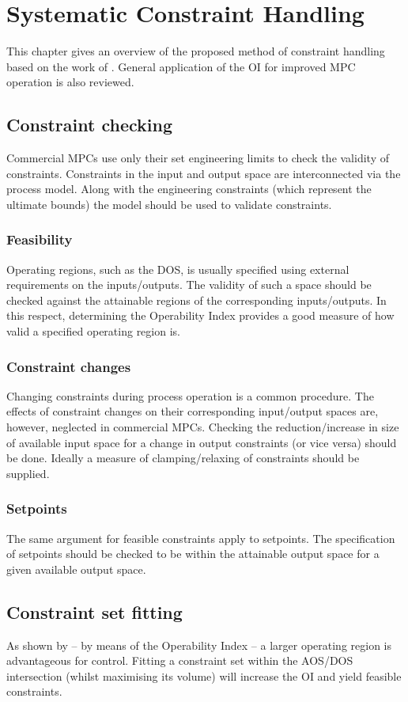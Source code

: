 \chapter{Systematic Constraint Handling}\label{chap:conhand}
\begin{overview}
  This chapter gives an overview of the proposed method of constraint handling based on the work of \citet{vinsonphd}.
  General application of the OI for improved MPC operation is also reviewed.
\end{overview}

\section{Constraint checking}
Commercial MPCs use only their set engineering limits to check the validity of constraints.
Constraints in the input and output space are interconnected via the process model.
Along with the engineering constraints (which represent the ultimate bounds) the model should be used to validate constraints. 
\subsection{Feasibility}
Operating regions, such as the DOS, is usually specified using external requirements on the inputs/outputs.
The validity of such a space should be checked against the attainable regions of the corresponding inputs/outputs.
In this respect, determining the Operability Index provides a good measure of how valid a specified operating region is.
\subsection{Constraint changes}
Changing constraints during process operation is a common procedure.
The effects of constraint changes on their corresponding input/output spaces are, however, neglected in commercial MPCs.
Checking the reduction/increase in size of available input space for a change in output constraints (or vice versa) should be done.
Ideally a measure of clamping/relaxing of constraints should be supplied.
\subsection{Setpoints}
The same argument for feasible constraints apply to setpoints.
The specification of setpoints should be checked to be within the attainable output space for a given available output space.

\section{Constraint set fitting}
As shown by \citet{vinsonphd} -- by means of the Operability Index -- a larger operating region is advantageous for control.
Fitting a constraint set within the AOS/DOS intersection (whilst maximising its volume) will increase the OI and yield feasible constraints.
